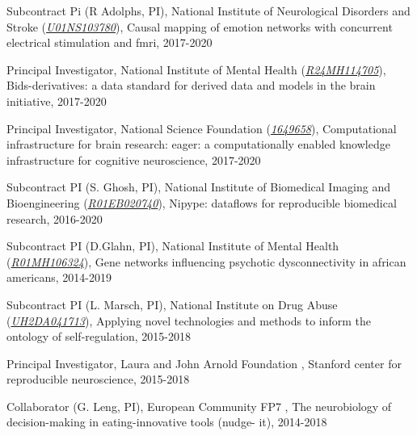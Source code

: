 \documentclass[10pt, letterpaper]{article}
\begin{document}
Subcontract Pi (R Adolphs, PI), National Institute of Neurological Disorders and Stroke  (\href{http://projectreporter.nih.gov/project_info_description.cfm?aid=9830084}{\textit{U01NS103780}}), Causal mapping of emotion networks with concurrent electrical stimulation and fmri, 2017-2020\vspace{2mm}

Principal Investigator, National Institute of Mental Health  (\href{http://projectreporter.nih.gov/project_info_description.cfm?aid=9566304}{\textit{R24MH114705}}), Bids-derivatives: a data standard for derived data and models in the brain initiative, 2017-2020\vspace{2mm}

Principal Investigator, National Science Foundation  (\href{http://www.nsf.gov/awardsearch/showAward?AWD_ID=1649658&HistoricalAwards=false}{\textit{1649658}}), Computational infrastructure for brain research: eager: a computationally enabled knowledge infrastructure for cognitive neuroscience, 2017-2020\vspace{2mm}

Subcontract PI (S. Ghosh, PI), National Institute of Biomedical Imaging and Bioengineering  (\href{https://projectreporter.nih.gov/project_info_description.cfm?aid=9603723}{\textit{R01EB020740}}), Nipype: dataflows for reproducible biomedical research, 2016-2020\vspace{2mm}

Subcontract PI (D.Glahn, PI), National Institute of Mental Health  (\href{http://projectreporter.nih.gov/project_info_description.cfm?aid=9634110}{\textit{R01MH106324}}), Gene networks influencing psychotic dysconnectivity in african americans, 2014-2019\vspace{2mm}

Subcontract PI (L. Marsch, PI), National Institute on Drug Abuse  (\href{http://projectreporter.nih.gov/project_info_description.cfm?aid=9310428}{\textit{UH2DA041713}}), Applying novel technologies and methods to inform the ontology of self-regulation, 2015-2018\vspace{2mm}

Principal Investigator, Laura and John Arnold Foundation , Stanford center for reproducible neuroscience, 2015-2018\vspace{2mm}

Collaborator (G. Leng, PI), European Community FP7 , The neurobiology of decision-making in eating-innovative tools (nudge- it), 2014-2018\vspace{2mm}
\end{document}
